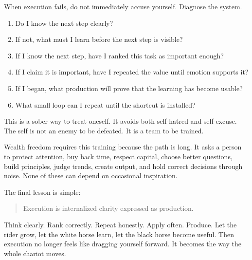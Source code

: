 When execution fails, do not immediately accuse yourself. Diagnose the system.

\begin{enumerate}
\item Do I know the next step clearly?
\item If not, what must I learn before the next step is visible?
\item If I know the next step, have I ranked this task as important enough?
\item If I claim it is important, have I repeated the value until emotion supports it?
\item If I began, what production will prove that the learning has become usable?
\item What small loop can I repeat until the shortcut is installed?
\end{enumerate}

This is a sober way to treat oneself. It avoids both self-hatred and self-excuse. The self is not an enemy to be defeated. It is a team to be trained.

Wealth freedom requires this training because the path is long. It asks a person to protect attention, buy back time, respect capital, choose better questions, build principles, judge trends, create output, and hold correct decisions through noise. None of these can depend on occasional inspiration.

The final lesson is simple:

\begin{quote}
Execution is internalized clarity expressed as production.
\end{quote}

Think clearly. Rank correctly. Repeat honestly. Apply often. Produce. Let the rider grow, let the white horse learn, let the black horse become useful. Then execution no longer feels like dragging yourself forward. It becomes the way the whole chariot moves.
